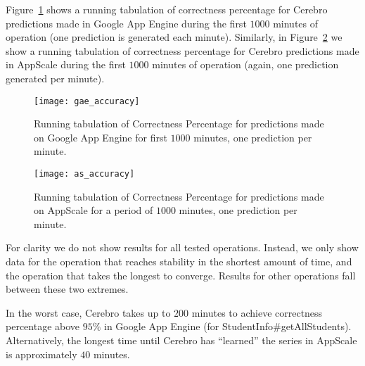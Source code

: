 Figure~\ref{fig:gae_accuracy} shows a running tabulation of
correctness percentage for Cerebro
predictions made in Google App Engine during the first 
$1000$ minutes of operation (one prediction is generated each minute). 
Similarly, in Figure~\ref{fig:as_accuracy} we show a running tabulation of
correctness percentage for Cerebro
predictions made in AppScale during the first 
$1000$ minutes of operation (again, one prediction generated per minute). 

\begin{figure}
\centering
\texttt{[image: gae\_accuracy]}
\caption{Running tabulation of Correctness Percentage for predictions made on Google App 
Engine for first $1000$ minutes, one prediction per minute.}
\label{fig:gae_accuracy}
\vspace{-0.2in}
\end{figure}

\begin{figure}
\centering
\texttt{[image: as\_accuracy]}
\caption{Running tabulation of Correctness Percentage for predictions made on AppScale for a period
of $1000$ minutes, one prediction per minute.}
\label{fig:as_accuracy}
\vspace{-0.2in}
\end{figure}

For clarity we do not show results for all tested operations. Instead,
we only show data for the operation that reaches stability in the shortest
amount of time, and the operation that takes the longest to converge.
Results for other operations fall between these two extremes.

In the worst case, Cerebro takes up to $200$ minutes to 
achieve correctness percentage above $95\%$
in Google App Engine (for StudentInfo\#getAllStudents).
Alternatively, the longest time until Cerebro has ``learned'' the series in
AppScale is approximately $40$ minutes.

